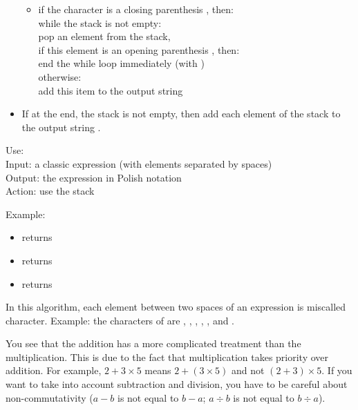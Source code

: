 \documentclass[11pt,class=report,crop=false]{standalone}
\begin{document}
\begin{activite}
\begin{algorithme}
\begin{itemize}
\begin{itemize}
     \item if the character is a closing parenthesis , then: \\
     while the stack is not empty: \\
     \indentation pop an element from the stack, \\
     \indentation if this element is an opening parenthesis , then: \\
     \indentation \indentation end the \og{}while\fg{} loop immediately  (with )\\  
     \indentation otherwise: \\       
     \indentation \indentation add this item to the output string \\

   \end{itemize}          
         
    \item If at the end, the stack is not empty, then add each element of the stack to the output string .
  \end{itemize} 
             
 \end{algorithme}
 
 
   \begin{fonction}
  Use:  \\
  Input: a classic expression (with elements separated by spaces) \\
  Output: the expression in Polish notation \\
  Action: use the stack
  
  \medskip
  
  Example:
  \begin{itemize}
     \item {} returns 
     \item {} returns 
     \item {} returns 
  \end{itemize}     
  \end{fonction}
  
 In this algorithm, each element between two spaces of an expression is miscalled \og{}character\fg{}. Example: the characters of  are \ci{(}, , \ci{+}, , \ci{)}, \ci{*} and .
 
 You see that the addition has a more complicated treatment than the multiplication. This is due to the fact that multiplication takes priority over addition. For example, $2+3 \times 5$ means $2+(3 \times 5)$ and not $(2+3) \times 5$. 
 If you want to take into account subtraction and division, you have to be careful about non-commutativity ($a-b$ is not equal to $b-a$; $a\div b$ is not equal to $b \div a$).
 


\end{activite}
\end{document}

